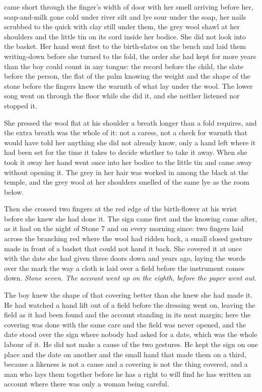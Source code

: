  came short through the finger's width of door with her smell arriving before her, soap-and-milk gone cold under river silt and lye sour under the soap, her nails scrubbed to the quick with clay still under them, the grey wool shawl at her shoulders and the little tin on its cord inside her bodice. She did not look into the basket. Her hand went first to the birth-slates on the bench and laid them writing-down before she turned to the fold, the order she had kept for more years than the boy could count in any tongue: the record before the child, the slate before the person, the flat of the palm knowing the weight and the shape of the stone before the fingers knew the warmth of what lay under the wool. The lower song went on through the floor while she did it, and she neither listened nor stopped it.

She pressed the wool flat at his shoulder a breath longer than a fold requires, and the extra breath was the whole of it: not a caress, not a check for warmth that would have told her anything she did not already know, only a hand left where it had been set for the time it takes to decide whether to take it away. When she took it away her hand went once into her bodice to the little tin and came away without opening it. The grey in her hair was worked in among the black at the temple, and the grey wool at her shoulders smelled of the same lye as the room below.

Then she crossed two fingers at the red edge of the birth-flower at his wrist before she knew she had done it. The sign came first and the knowing came after, as it had on the night of Stone 7 and on every morning since: two fingers laid across the branching red where the wool had ridden back, a small closed gesture made in front of a basket that could not hand it back. She covered it at once with the date she had given three doors down and years ago, laying the words over the mark the way a cloth is laid over a field before the instrument comes down. \emph{Stone seven. The account went up on the eighth, before the paper went out.}

The boy knew the shape of that covering better than she knew she had made it. He had watched a hand lift out of a field before the dressing went on, leaving the field as it had been found and the account standing in its neat margin; here the covering was done with the same care and the field was never opened, and the date stood over the sign where nobody had asked for a date, which was the whole labour of it. He did not make a cause of the two gestures. He kept the sign on one place and the date on another and the small hand that made them on a third, because a likeness is not a cause and a covering is not the thing covered, and a man who lays them together before he has a right to will find he has written an account where there was only a woman being careful.

